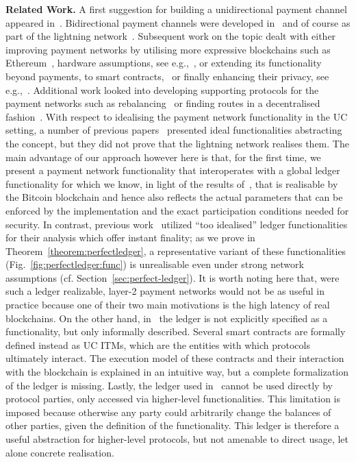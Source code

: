 \noindent \textbf{Related Work.} A first suggestion for building a
unidirectional payment channel appeared in~\cite{spilman}. Bidirectional payment
channels were developed in~\cite{DBLP:conf/sss/DeckerW15} and of course as part
of the lightning network~\cite{lightning}. Subsequent work on the topic dealt
with either improving payment networks by utilising more expressive blockchains
such as Ethereum~\cite{perun}, hardware assumptions, see
e.g.,~\cite{DBLP:conf/systor/LindNEKPS18}, or extending its functionality beyond
payments, to smart contracts,~\cite{sprites} or finally enhancing their privacy,
see
e.g.,~\cite{Malavolta:2017:CPP:3133956.3134096,DBLP:conf/ccs/0001M17,DBLP:conf/ndss/HeilmanABSG17}.
Additional work looked into developing supporting protocols for the payment
networks such as rebalancing~\cite{DBLP:conf/ccs/KhalilG17} or finding routes in
a decentralised fashion~\cite{flare,spider}. With respect to idealising the
payment network functionality in the UC setting, a number of previous
papers~\cite{DBLP:conf/ccs/DziembowskiFH18,Malavolta:2017:CPP:3133956.3134096,sprites,perun}
presented ideal functionalities abstracting the concept, but they did
not prove that the lightning network realises them. The main advantage of our
approach however here is that, for the first time, we present a payment network
functionality that interoperates with a global ledger functionality for which we
know, in light of the results of~\cite{BMTZ17}, that is realisable by the
Bitcoin blockchain and hence also reflects the actual parameters that can be
enforced by the implementation and the exact participation conditions needed for
security. In contrast, previous
work~\cite{DBLP:conf/ccs/DziembowskiFH18,Malavolta:2017:CPP:3133956.3134096,perun}
utilized ``too idealised'' ledger functionalities for their analysis which offer
instant finality; as we prove in Theorem~\ref{theorem:perfectledger}, a
representative variant of these functionalities
(Fig.~\ref{fig:perfectledger:func}) is unrealisable even under strong network
assumptions (cf. Section~\ref{sec:perfect-ledger}). It is worth noting
here that, were such a ledger realizable, layer-2 payment networks would not be
as useful in practice because one of their two main motivations is the high
latency of real blockchains. On the other hand, in~\cite{sprites} the ledger is
not explicitly specified as a functionality, but only informally described.
Several smart contracts are formally defined instead as UC ITMs, which are the
entities with which protocols ultimately interact. The execution model of these
contracts and their interaction with the blockchain is explained in an intuitive
way, but a complete formalization of the ledger is missing. Lastly, the
ledger used in~\cite{DBLP:conf/ccs/DziembowskiFH18} cannot be used directly by
protocol parties, only accessed via higher-level functionalities. This
limitation is imposed because otherwise any party could arbitrarily change the
balances of other parties, given the definition of the functionality. This
ledger is therefore a useful abstraction for higher-level protocols, but not
amenable to direct usage, let alone concrete realisation.

